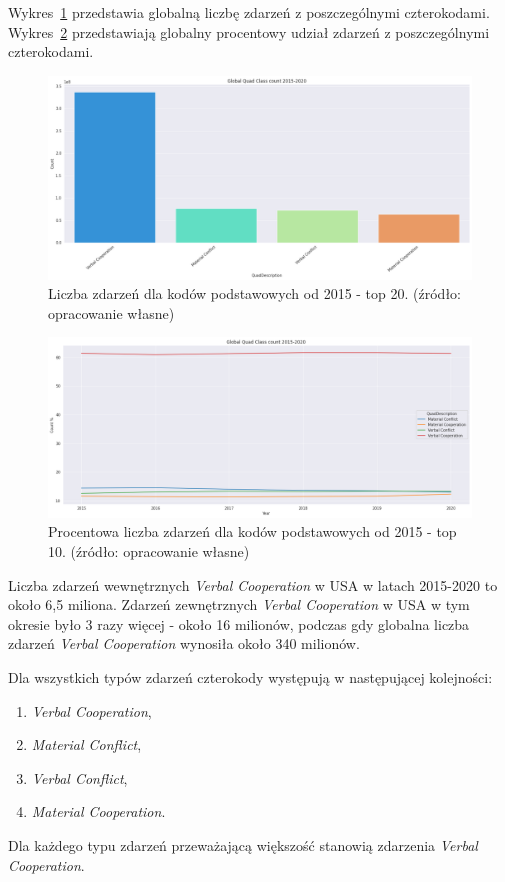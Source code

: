 \documentclass[11pt]{report}
\begin{document}
    Wykres~\ref{fig:GLOBAL_QC} przedstawia globalną liczbę zdarzeń z poszczególnymi czterokodami.
    Wykres~\ref{fig:GLOBAL_QCperc} przedstawiają globalny procentowy udział zdarzeń z poszczególnymi czterokodami.

    \begin{figure}[!htp]
        \centering
        \includegraphics[width=\linewidth]{fig/GLOBAL//QC.png}
        \caption{Liczba zdarzeń dla kodów podstawowych od 2015 - top 20. (źródło: opracowanie własne)}
        \label{fig:GLOBAL_QC}
    \end{figure}

    \begin{figure}[!htp]
        \centering
        \includegraphics[width=\linewidth]{fig/GLOBAL/QCperc.png}
        \caption{Procentowa liczba zdarzeń dla kodów podstawowych od 2015 - top 10. (źródło: opracowanie własne)}
        \label{fig:GLOBAL_QCperc}
    \end{figure}

    Liczba zdarzeń wewnętrznych \textit{Verbal Cooperation} w USA w latach 2015-2020 to około 6,5 miliona.
    Zdarzeń zewnętrznych \textit{Verbal Cooperation} w USA w tym okresie było 3 razy więcej - około 16 milionów,
    podczas gdy globalna liczba zdarzeń \textit{Verbal Cooperation} wynosiła około 340 milionów.

    Dla wszystkich typów zdarzeń czterokody występują w następującej kolejności:
    \begin{enumerate}
        \item \textit{Verbal Cooperation},
        \item \textit{Material Conflict},
        \item \textit{Verbal Conflict},
        \item \textit{Material Cooperation}.
    \end{enumerate}
    Dla każdego typu zdarzeń przeważającą większość stanowią zdarzenia \textit{Verbal Cooperation}.
\end{document}
